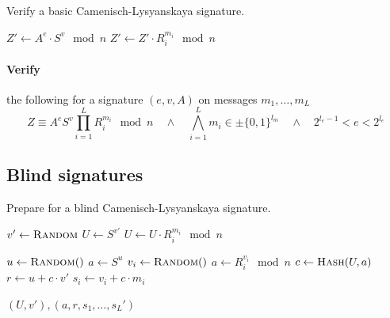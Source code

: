 \begin{algorithm}[t]
  \caption{Verify a basic Camenisch-Lysyanskaya signature.}
  \label{alg:CL-verify}
  \addtolength{\baselineskip}{1mm}
  \begin{algorithmic}[1]
      \State $Z' \gets A^e \cdot S^v \mod n$
        \State $Z' \gets Z' \cdot R_i^{m_i} \mod n$
      \EndFor

        \Return {}
      \EndIf

      \Return {}
    \EndFunction
  \end{algorithmic}
\end{algorithm}

\paragraph{Verify} the following for a signature $(e, v, A)$ on messages $m_1, \dots, m_L$
\begin{equation*}
  Z \equiv A^e S^v \prod_{i=1}^{L} R_i^{m_i} \mod n
  \quad\land\quad
  \bigwedge_{i=1}^{L} m_i \in \pm \{0,1\}^{l_m}
  \quad\land\quad
  2^{l_e-1} < e < 2^{l_e}
\end{equation*}

\subsection{Blind signatures}\label{sec:cl_blind}

\begin{algorithm}[t]
  \caption{Prepare for a blind Camenisch-Lysyanskaya signature.}
  \label{alg:CL-blind-prepare}
  \addtolength{\baselineskip}{1mm}
  \begin{algorithmic}[1]
      \State $v' \gets \Call{Random}{}$
      \State $U \gets S^{v'}$
        \State $U \gets U \cdot R_i^{m_i} \mod n$
      \EndFor

      \State $u \gets \Call{Random}$
      \State $a \gets S^u$
        \State $v_i \gets \Call{Random}$
        \State $a \gets R_i^{v_i} \mod n$
      \EndFor
      \State $c \gets \Call{Hash}{U, a}$
      \State $r \gets u + c \cdot v'$
        \State $s_i \gets v_i + c \cdot m_i$
      \EndFor

      \Return $(U, v'), (a, r, s_1, \dots, s_L')$
    \EndFunction
  \end{algorithmic}
\end{algorithm}

